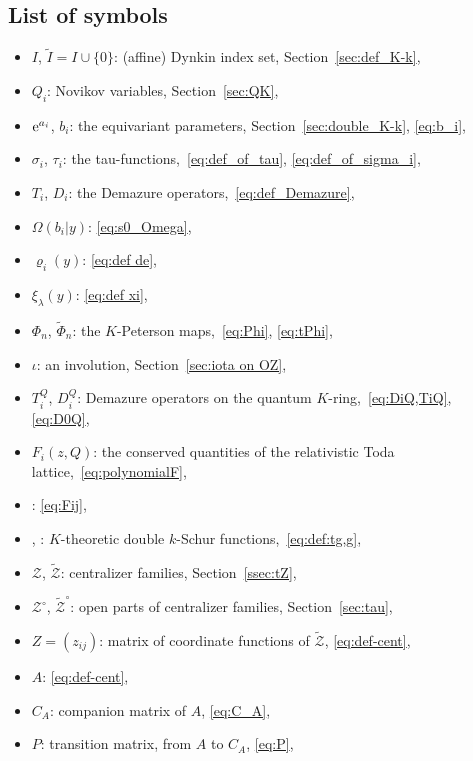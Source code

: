 \documentclass[pdftex]{sigma}
\numberwithin{equation}{section}
\newcommand{\co}{\xi}
\newcommand{\Iaf}{\tilde{I}}
\newcommand{\la}{\lambda}
\newcommand{\de}{\varrho}
\theoremstyle{definition}
\begin{document}
\subsection*{List of symbols}
\begin{itemize}[itemsep=0pt]%
\item $I$, $\Iaf=I\cup\{0\}$: (affine) Dynkin index set, Section~\ref{sec:def_K-k},
 \item $Q_i$: Novikov variables, Section~\ref{sec:QK},
 \item ${\rm e}^{a_i}$, $b_i$: the equivariant parameters, Section~\ref{sec:double_K-k}, \eqref{eq:b_i},
 \item $\sigma_i$, $\tau_i$: the tau-functions,~\eqref{eq:def_of_tau}, \eqref{eq:def_of_sigma_i},
 \item $T_i$, $D_i$: the Demazure operators,~\eqref{eq:def_Demazure},
 \item $\Omega(b_i|y)$: \eqref{eq:s0_Omega},
 \item $\de_i(y)$: \eqref{eq:def de},
 \item $\co_\la(y)$: \eqref{eq:def xi},
 \item $\Phi_n$, $\tilde{\Phi}_n$: the $K$-Peterson maps,~\eqref{eq:Phi}, \eqref{eq:tPhi},
 \item $\iota$: an involution, Section~\ref{sec:iota on OZ},
 \item $T_i^Q$, $D_i^Q$: Demazure operators on the quantum $K$-ring,~\eqref{eq:DiQ,TiQ}, \eqref{eq:D0Q},
 \item $F_i(z,Q)$: the conserved quantities of the relativistic Toda lattice,~\eqref{eq:polynomialF},
 \item {}: \eqref{eq:Fij},
 \item {}, : $K$-theoretic double $k$-Schur functions,~\eqref{eq:def:tg,g},
 \item $\mathscr{Z}$, $\tilde{\mathscr{Z}}$: centralizer families, Section~\ref{ssec:tZ},
 \item $\mathscr{Z}^\circ$, $\tilde{\mathscr{Z}}^\circ$: open parts of centralizer families, Section~\ref{sec:tau},
 \item $Z=(z_{ij})$: matrix of coordinate functions of $\tilde{\mathscr{Z}}$, \eqref{eq:def-cent},
 \item $A$: \eqref{eq:def-cent},
 \item $C_A$: companion matrix of $A$, \eqref{eq:C_A},
 \item $P$: transition matrix,
 from $A$ to $C_A$, \eqref{eq:P},

\end{itemize}
\end{document}
